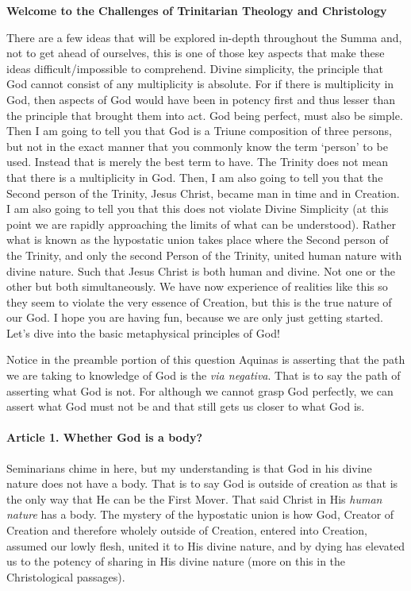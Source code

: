 \documentclass{ucetd}
\begin{document}
\textbf{Welcome to the Challenges of Trinitarian Theology and Christology}

There are a few ideas that will be explored in-depth throughout the Summa and, not to get ahead of ourselves, this is one of those key aspects that make these ideas difficult/impossible to comprehend. Divine simplicity, the principle that God cannot consist of any multiplicity is absolute. For if there is multiplicity in God, then aspects of God would have been in potency first and thus lesser than the principle that brought them into act. God being perfect, must also be simple. Then I am going to tell you that God is a Triune composition of three persons, but not in the exact manner that you commonly know the term `person' to be used. Instead that is merely the best term to have. The Trinity does not mean that there is a multiplicity in God. Then, I am also going to tell you that the Second person of the Trinity, Jesus Christ, became man in time and in Creation. I am also going to tell you that this does not violate Divine Simplicity (at this point we are rapidly approaching the limits of what can be understood). Rather what is known as the hypostatic union takes place where the Second person of the Trinity, and only the second Person of the Trinity, united human nature with divine nature. Such that Jesus Christ is both human and divine. Not one or the other but both simultaneously. We have now experience of realities like this so they seem to violate the very essence of Creation, but this is the true nature of our God. I hope you are having fun, because we are only just getting started. Let's dive into the basic metaphysical principles of God!

Notice in the preamble portion of this question Aquinas is asserting that the path we are taking to knowledge of God is the \textit{via negativa}. That is to say the path of asserting what God is not. For although we cannot grasp God perfectly, we can assert what God must not be and that still gets us closer to what God is.

\paragraph{Article 1. Whether God is a body?}
Seminarians chime in here, but my understanding is that God in his divine nature does not have a body. That is to say God is outside of creation as that is the only way that He can be the First Mover. That said Christ in His \textit{human nature} has a body. The mystery of the hypostatic union is how God, Creator of Creation and therefore wholely outside of Creation, entered into Creation, assumed our lowly flesh, united it to His divine nature, and by dying has elevated us to the potency of sharing in His divine nature (more on this in the Christological passages). 
\end{document}
